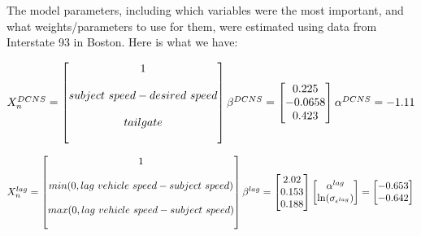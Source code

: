 The model parameters, including which variables were the most important, and what weights/parameters to use for them, were estimated using data from Interstate 93 in Boston. Here is what we have:

\noindent 

$X_n^{DCNS} =
\begin{bmatrix}
    1 \\ \\
    subject\ speed - desired\ speed  \\ \\
    tailgate \\ \\
\end{bmatrix}
\beta^{DCNS} = \begin{bmatrix}
    0.225\\
    -0.0658\\
    0.423\\
\end{bmatrix}
\alpha^{DCNS} = -1.11\\
$

$
\noindent X_n^{lag} = \begin{bmatrix}
    1 \\ \\
    min(0, lag\ vehicle\ speed - subject\ speed)  \\ \\
    max(0, lag\ vehicle\ speed - subject\ speed)  \\ \\
\end{bmatrix}
\beta^{lag} = \begin{bmatrix}
    2.02\\
    0.153\\
    0.188\\
\end{bmatrix}
\begin{bmatrix}
    \alpha^{lag} \\
    \ln(\sigma_{\epsilon^{lag}})\\
\end{bmatrix} = \begin{bmatrix}
    -0.653 \\
    -0.642 \\
\end{bmatrix}\\
$


